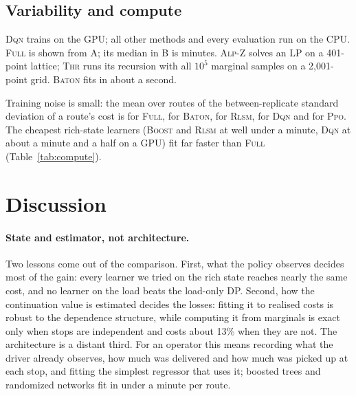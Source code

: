 \documentclass[trsc,dblanonrev]{informs4}
\newcommand{\Full}{\textsc{Full}}
\newcommand{\Boost}{\textsc{Boost}}
\newcommand{\Baton}{\textsc{Baton}}
\newcommand{\Thr}{\textsc{Thr}}
\newcommand{\Alpz}{\textsc{Alp-Z}}
\newcommand{\Rlsm}{\textsc{Rlsm}}
\newcommand{\Dqn}{\textsc{Dqn}}
\newcommand{\Ppo}{\textsc{Ppo}}
\begin{document}
\subsection{Variability and compute}

\begin{table}[t]
{}
{\Dqn{} trains on the GPU; all other methods and every evaluation run on the
CPU. \Full{} is shown from A; its median in B is \FullMinutesB{} minutes.
\Alpz{} solves an LP on a 401-point lattice; \Thr{} runs its recursion with all
$10^5$ marginal samples on a 2{,}001-point grid. \Baton{} fits in about a
second.}
\end{table}

Training noise is small: the mean over routes of the between-replicate
standard deviation of a route's cost is \RepSdFull{} for \Full{},
\RepSdBaton{} for \Baton{}, \RepSdRlsm{} for \Rlsm{}, \RepSdDqn{} for \Dqn{}
and \RepSdPpo{} for \Ppo{}. The cheapest rich-state learners (\Boost{} and
\Rlsm{} at well under a minute, \Dqn{} at about a minute and a half on a GPU)
fit far faster than \Full{} (Table~\ref{tab:compute}).

\section{Discussion}\label{sec:discussion}

\paragraph{State and estimator, not architecture.} Two lessons come out of
the comparison. First, what the policy observes decides most of the gain: every
learner we tried on the rich state reaches nearly the same cost, and no learner
on the load beats the load-only DP. Second, how the continuation value is
estimated decides the losses: fitting it to realised costs is robust to the
dependence structure, while computing it from marginals is exact only when
stops are independent and costs about 13\% when they are not. The
architecture is a distant third. For an operator this means recording what
the driver already observes, how much was delivered and how much was picked
up at each stop, and fitting the simplest regressor that uses it; boosted
trees and randomized networks fit in under a minute per route.
\end{document}
